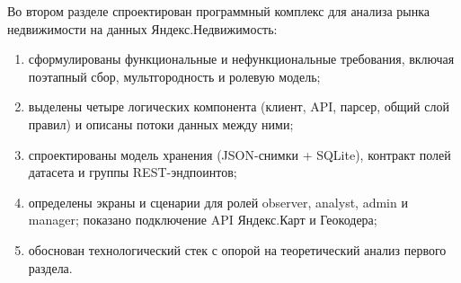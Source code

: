 Во втором разделе спроектирован программный комплекс для анализа рынка недвижимости на данных Яндекс.Недвижимость:
\begin{enumerate}
    \item сформулированы функциональные и нефункциональные требования, включая поэтапный сбор, мультгородность и ролевую модель;
    \item выделены четыре логических компонента (клиент, API, парсер, общий слой правил) и описаны потоки данных между ними;
    \item спроектированы модель хранения (JSON-снимки + SQLite), контракт полей датасета и группы REST-эндпоинтов;
    \item определены экраны и сценарии для ролей observer, analyst, admin и manager; показано подключение API Яндекс.Карт и Геокодера;
    \item обоснован технологический стек с опорой на теоретический анализ первого раздела.
\end{enumerate}
